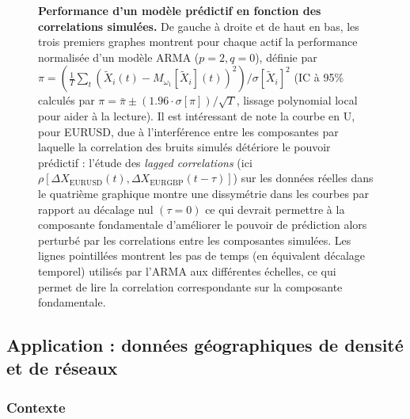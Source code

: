 \begin{figure}[h!]
\caption{\small \textbf{Performance d'un modèle prédictif en fonction des correlations simulées.} De gauche à droite et de haut en bas, les trois premiers graphes montrent pour chaque actif la performance normalisée d'un modèle ARMA ($p=2,q=0$), définie par $\pi = \left(\frac{1}{T}\sum_t\left(\tilde{X}_i(t) - M_{\omega_1}\left[\tilde{X}_i\right](t)\right)^2 \right) / \sigma \left[ \tilde{X}_i \right]^2$ (IC à 95\% calculés par $\pi = \bar{\pi} \pm (1.96\cdot \sigma [\pi])/\sqrt{T}$, lissage polynomial local pour aider à la lecture). Il est intéressant de note la courbe en U, pour EURUSD, due à l'interférence entre les composantes par laquelle la correlation des bruits simulés détériore le pouvoir prédictif : l'étude des \emph{lagged correlations} (ici $\rho [\Delta X_{\textrm{EURUSD}}(t),\Delta X_{\textrm{EURGBP}}(t-\tau)]$) sur les données réelles dans le quatrième graphique montre une dissymétrie dans les courbes par rapport au décalage nul $(\tau = 0)$ ce qui devrait permettre à la composante fondamentale d'améliorer le pouvoir de prédiction alors perturbé par les correlations entre les composantes simulées. Les lignes pointillées montrent les pas de temps (en équivalent décalage temporel) utilisés par l'ARMA aux différentes échelles, ce qui permet de lire la correlation correspondante sur la composante fondamentale.}
\label{fig:model_perf}
\end{figure}




\newpage




\subsection{Application : données géographiques de densité et de réseaux}


\subsubsection{Contexte}


